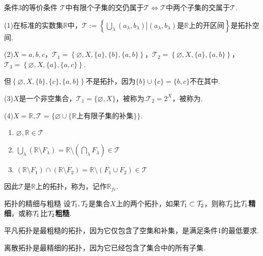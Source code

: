 \begin{proposition}{条件3的等价条件}
    $\mathcal{T}$中有限个子集的交仍属于$\mathcal{T} \Leftrightarrow \mathcal{T}$中两个子集的交属于$\mathcal{T}$.
\end{proposition}

\begin{instance}
    (1)在标准的实数集$\mathbb{R}$中，$\mathcal{T}:=\left\{\bigcup_\lambda{(a_\lambda,b_\lambda)}\left|(a_\lambda,b_\lambda)\text{是}\mathbb{R}\text{上的开区间}\right.\right\}$是拓扑空间.\par
    (2)$X={a,b,c}$，$\mathcal{T}_1 = \left\{\varnothing,X,\{a\},\{b\},\{a,b\}\right\}$，$\mathcal{T}_2 = \left\{\varnothing,X,\{a\},\{a,b\}\right\}$，$\mathcal{T}_3 = \left\{\varnothing,X,\{a\},\{a,c\}\right\}$.\par
    但$\left\{\varnothing,X,\{b\},\{c\},\{a,b\}\right\}$不是拓扑，因为$\{b\}\cup\{c\}=\{b,c\}$不在其中.\par
    (3)$X$是一个非空集合，$\mathcal{T}_1=\{\varnothing,X\}$，被称为.$\mathcal{T}_2=2^X$，被称为.\par
    (4)$X=\mathbb{R},\mathcal{T}=\{\varnothing\cup\{\mathbb{R}\text{上有限子集的补集}\}\}$.
    \begin{enumerate}[leftmargin=4em,label=(i)]
        \item $\varnothing,\mathbb{R} \in \mathcal{T}$
        \item $\bigcup_{\lambda}{\left(\mathbb{R}\setminus F_\lambda\right)}=\mathbb{R}\setminus\left(\bigcap_{\lambda}{F_\lambda}\right) \in \mathcal{T}$
        \item $(\mathbb{R}\setminus F_1) \cap (\mathbb{R}\setminus F_2)=\mathbb{R}\setminus\left(F_1\cup F_2\right) \in \mathcal{T}$
    \end{enumerate}
    因此$\mathcal{T}$是$\mathbb{R}$上的拓扑，称为，记作$\mathbb{R}_{fc}$.
\end{instance}

\begin{definition}{拓扑的精细与粗糙}
    设$\cal{T}_1,\cal{T}_2$是集合$X$上的两个拓扑，如果$\cal{T}_1\subset \cal{T}_2$，则称$\cal{T}_2$比$\cal{T}_1$\textbf{精细}，或称$\cal{T}_1$比$\cal{T}_2$\textbf{粗糙}.
\end{definition}
\begin{conclusion}
    平凡拓扑是最粗糙的拓扑，因为它仅包含了空集和补集，是满足条件1的最低要求.\par
    离散拓扑是最精细的拓扑，因为它已经包含了集合中的所有子集.\par
\end{conclusion}




